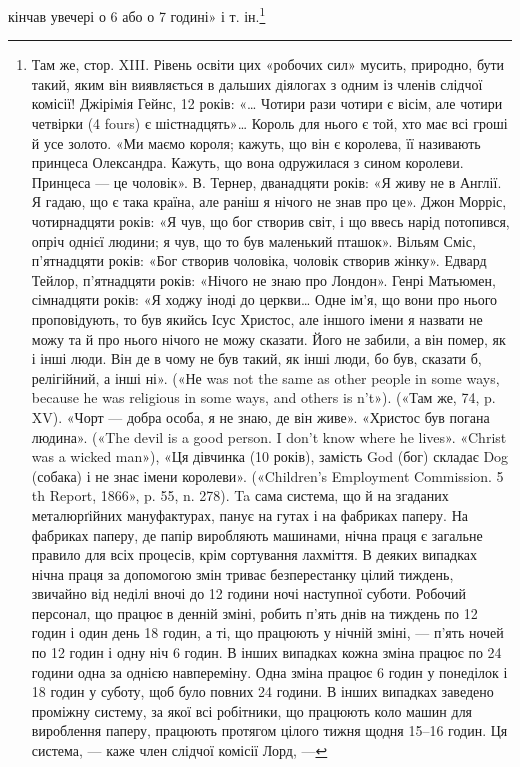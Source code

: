 кінчав увечері о 6 або о 7 годині» і т. ін.\footnote{
Там же, стор. XIII. Рівень освіти цих «робочих сил» мусить, природно,
бути такий, яким він виявляється в дальших діялогах з одним із
членів слідчої комісії! Джірімія Гейнс, 12 років: «\dots{} Чотири рази чотири
є вісім, але чотири четвірки (4 fours) є шістнадцять»\dots{} Король для
нього є той, хто має всі гроші й усе золото. «Ми маємо короля; кажуть,
що він є королева, її називають принцеса Олександра. Кажуть, що вона
одружилася з сином королеви. Принцеса — це чоловік». В. Тернер,
дванадцяти років: «Я живу не в Англії. Я гадаю, що є така країна, але
раніш я нічого не знав про це». Джон Морріс, чотирнадцяти років: «Я чув,
що бог створив світ, і що ввесь нарід потопився, опріч однієї людини; я
чув, що то був маленький пташок». Вільям Сміс, п’ятнадцяти років:
«Бог створив чоловіка, чоловік створив жінку». Едвард Тейлор, п’ятнадцяти
років: «Нічого не знаю про Лондон». Генрі Матьюмен, сімнадцяти
років: «Я ходжу іноді до церкви\dots{} Одне ім’я, що вони про нього проповідують,
то був якийсь Ісус Христос, але іншого імени я назвати не можу
та й про нього нічого не можу сказати. Його не забили, а він помер, як
і інші люди. Він де в чому не був такий, як інші люди, бо був, сказати б,
релігійний, а інші ні». («Не was not the same as other people in some ways,
because he was religious in some ways, and others is n’t»). («Там же, 74,
p. XV). «Чорт — добра особа, я не знаю, де він живе». «Христос був погана
людина». («The devil is a good person. I don’t know where he lives». «Christ
was a wicked man»), «Ця дівчинка (10 років), замість God (бог) складає
Dog (собака) і не знає імени королеви». («Children’s Employment Commission.
5 th Report, 1866», p. 55, n. 278). Ta сама система, що й на згаданих
металюрґійних мануфактурах, панує на гутах і на фабриках паперу.
На фабриках паперу, де папір виробляють машинами, нічна праця
є загальне правило для всіх процесів, крім сортування лахміття. В деяких
випадках нічна праця за допомогою змін триває безперестанку цілий
тиждень, звичайно від неділі вночі до 12 години ночі наступної суботи.
Робочий персонал, що працює в денній зміні, робить п’ять днів на тиждень
по 12 годин і один день 18 годин, а ті, що працюють у нічній зміні, — п’ять
ночей по 12 годин і одну ніч 6 годин. В інших випадках кожна зміна працює
по 24 години одна за однією навпереміну. Одна зміна працює 6 годин у
понеділок і 18 годин у суботу, щоб було повних 24 години. В інших випадках
заведено проміжну систему, за якої всі робітники, що працюють
коло машин для вироблення паперу, працюють протягом цілого тижня
щодня 15--16 годин. Ця система, — каже член слідчої комісії Лорд, —
}
